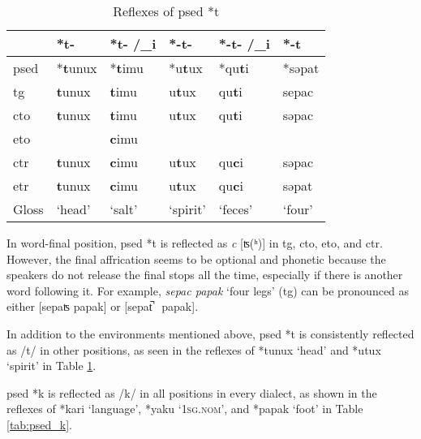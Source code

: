 \begin{table}[!htbp]
\centering
\caption{Reflexes of \acl{psed} *t}
\label{tab:psed_t}
\begin{tabular}{llllll}
\hline
           & *t-    & *t- /\_i & *-t-  & *-t- /\_i & *-t    \\ \hline
\acs{psed} & *\textbf{t}unux & *\textbf{t}imu    & *u\textbf{t}ux & *qu\textbf{t}i     & *səpat \\ \hdashline
\acs{tg}   & \textbf{t}unux  & \textbf{t}imu     & u\textbf{t}ux  & qu\textbf{t}i      & sepac  \\
\acs{cto}  & \textbf{t}unux  & \textbf{t}imu     & u\textbf{t}ux  & qu\textbf{t}i      & səpac  \\
\acs{eto}  &        & \textbf{c}imu&       &           &        \\
\acs{ctr}  & \textbf{t}unux  & \textbf{c}imu     & u\textbf{t}ux  & qu\textbf{c}i      & səpac  \\
\acs{etr}  & \textbf{t}unux  & \textbf{c}imu     & u\textbf{t}ux  & qu\textbf{c}i      & səpat  \\ \hline
Gloss      & `head' & `salt'   & `spirit' & `feces'  & `four' \\ \hline
\end{tabular}
\end{table}

In word-final position, \acl{psed} *t is reflected as \textit{c} [ʦ(ʰ)] in \acl{tg}, \acl{cto}, \acl{eto}, and \acl{ctr}. However, the final affrication seems to be optional and phonetic because the speakers do not release the final stops all the time, especially if there is another word following it. For example, \textit{sepac papak} `four legs' (\acs{tg}) can be pronounced as either [sepaʦ papak] or [sepat̚ \ papak]. 

In addition to the environments mentioned above, \acl{psed} *t is consistently reflected as /t/ in other positions, as seen in the reflexes of *tunux `head' and *utux `spirit' in Table \ref{tab:psed_t}.

\acl{psed} *k is reflected as /k/ in all positions in every dialect, as shown in the reflexes of *kari `language', *yaku `\textsc{1sg.nom}', and *papak `foot' in Table \ref{tab:psed_k}.

